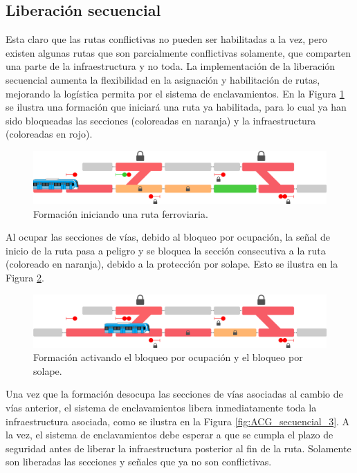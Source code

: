 \subsection{Liberación secuencial}
	\label{sec:ACG_liberacion}
	
	Esta claro que las rutas conflictivas no pueden ser habilitadas a la vez, pero existen algunas rutas que son parcialmente conflictivas solamente, que comparten una parte de la infraestructura y no toda. La implementación de la liberación secuencial aumenta la flexibilidad en la asignación y habilitación de rutas, mejorando la logística permita por el sistema de enclavamientos. En la Figura \ref{fig:ACG_secuencial_1} se ilustra una formación que iniciará una ruta ya habilitada, para lo cual ya han sido bloqueadas las secciones (coloreadas en naranja) y la infraestructura (coloreadas en rojo).
	
	 \begin{figure}[!h]
	     \centering
	     \includegraphics[width=1\textwidth]{Figuras/secuencial_1}
	     \centering\caption{Formación iniciando una ruta ferroviaria.}
	     \label{fig:ACG_secuencial_1}
	 \end{figure}
 
	Al ocupar las secciones de vías, debido al bloqueo por ocupación, la señal de inicio de la ruta pasa a peligro y se bloquea la sección consecutiva a la ruta (coloreado en naranja), debido a la protección por solape. Esto se ilustra en la Figura \ref{fig:ACG_secuencial_2}.
	
	\begin{figure}[!h]
    	 \centering
	     \includegraphics[width=1\textwidth]{Figuras/secuencial_2}
    	 \centering\caption{Formación activando el bloqueo por ocupación y el bloqueo por solape.}
    	 \label{fig:ACG_secuencial_2}
	\end{figure}
 
 	Una vez que la formación desocupa las secciones de vías asociadas al cambio de vías anterior, el sistema de enclavamientos libera inmediatamente toda la infraestructura asociada, como se ilustra en la Figura \ref{fig:ACG_secuencial_3}. A la vez, el sistema de enclavamientos debe esperar a que se cumpla el plazo de seguridad antes de liberar la infraestructura posterior al fin de la ruta. Solamente son liberadas las secciones y señales que ya no son conflictivas.
	   
